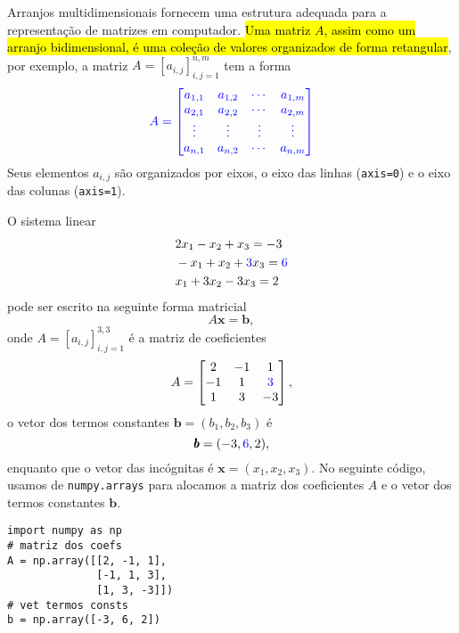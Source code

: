 Arranjos multidimensionais fornecem uma estrutura adequada para a representação de matrizes em computador. \hl{Uma matriz $A$, assim como um arranjo bidimensional, é uma coleção de valores organizados de forma retangular}, por exemplo, a matriz $A = [a_{i,j}]_{i,j=1}^{n,m}$ tem a forma
\begin{equation}\color{blue}A =
  \begin{bmatrix}
    a_{1,1} & a_{1,2} & \cdots & a_{1,m}\\
    a_{2,1} & a_{2,2} & \cdots & a_{2,m}\\
    \vdots & \vdots & \vdots & \vdots\\
    a_{n,1} & a_{n,2} & \cdots & a_{n,m}
  \end{bmatrix}
\end{equation}
Seus elementos $a_{i,j}$ são organizados por eixos, o eixo das linhas (\lstinline+axis=0+) e o eixo das colunas (\lstinline+axis=1+).

\begin{ex}\label{cap_arr_sec_mat:ex:sislin}
  O sistema linear
  \begin{subequations}
    \begin{align}
      &2x_1 - x_2 + x_3 = -3\\
      &-x_1 + x_2 + {\color{blue}3}x_3 = {\color{blue}6}\\
      &x_1 + 3x_2 - 3x_3 = 2
    \end{align}
  \end{subequations}
  pode ser escrito na seguinte forma matricial
  \begin{equation}
    A\pmb{x} = \pmb{b},
  \end{equation}
  onde $A = [a_{i,j}]_{i,j=1}^{3,3}$ é a matriz de coeficientes
  \begin{equation}
    A =
    \begin{bmatrix}
      2 & -1 & 1\\
      -1 & 1 & {\color{blue}3}\\
      1 & 3 & -3
    \end{bmatrix},
  \end{equation}
  o vetor dos termos constantes $\pmb{b} = (b_1, b_2, b_3)$ é
  \begin{equation}
    \pmb{b} = (-3, {\color{blue}6}, 2),
  \end{equation}
  enquanto que o vetor das incógnitas é $\pmb{x} = (x_1, x_2, x_3)$. No seguinte código, usamos de \lstinline+numpy.arrays+ para alocamos a matriz dos coeficientes $A$ e o vetor dos termos constantes $\pmb{b}$.

\begin{lstlisting}
import numpy as np
# matriz dos coefs
A = np.array([[2, -1, 1],
              [-1, 1, 3],
              [1, 3, -3]])
# vet termos consts
b = np.array([-3, 6, 2])
\end{lstlisting}

\end{ex}

